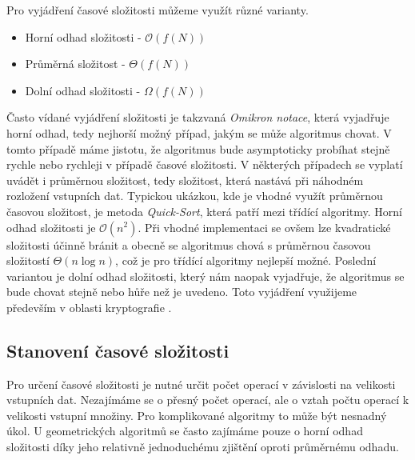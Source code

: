 Pro vyjádření časové složitosti můžeme využít různé varianty.
\begin{itemize}
	\item Horní odhad složitosti - $\mathcal{O} (f(N))$
	\item Průměrná složitost - $\Theta (f(N))$
	\item Dolní odhad složitosti - $\Omega (f(N))$
\end{itemize}	
Často vídané vyjádření složitosti je takzvaná \textit{Omikron notace},
která vyjadřuje horní odhad, tedy nejhorší možný případ, jakým se může
algoritmus chovat. V tomto případě máme jistotu, že algoritmus bude
asymptoticky probíhat stejně rychle nebo rychleji v případě časové
složitosti. V některých případech se vyplatí uvádět i průměrnou
složitost, tedy složitost, která nastává při náhodném rozložení
vstupních dat. Typickou ukázkou, kde je vhodné využít průměrnou
časovou složitost, je metoda \textit{Quick-Sort}, která patří mezi
třídící algoritmy. Horní odhad složitosti je $\mathcal{O}(n^2)$. Při
vhodné implementaci se ovšem lze kvadratické složitosti účinně bránit
a obecně se algoritmus chová s průměrnou časovou složitostí
$\Theta (n \log n)$, což je pro třídící algoritmy nejlepší
možné.\cite{wirth1989algoritmy} Poslední variantou je dolní odhad
složitosti, který nám naopak vyjadřuje, že algoritmus se bude chovat
stejně nebo hůře než je uvedeno. Toto vyjádření využijeme především v
oblasti kryptografie \cite{milkova2010algoritmy,bayer2008algoritmy}.
	
\subsection{Stanovení časové složitosti}
Pro určení časové složitosti je nutné určit počet operací v závislosti
na velikosti vstupních dat. Nezajímáme se o přesný počet operací, ale
o vztah počtu operací k velikosti vstupní množiny. Pro komplikované
algoritmy to může být nesnadný úkol. U geometrických algoritmů se
často zajímáme pouze o horní odhad složitosti díky jeho relativně
jednoduchému zjištění oproti průměrnému odhadu.
	

